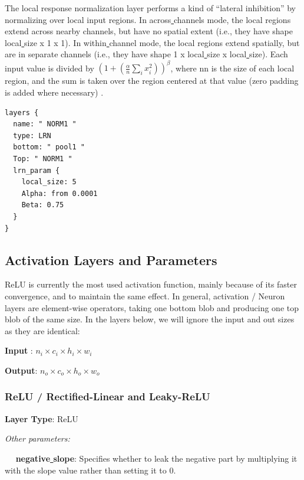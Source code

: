 \documentclass[12pt]{article}
\begin{document}
The local response normalization layer performs a kind of “lateral inhibition” by normalizing over local input regions. In across\underline{{ }{ }}channels mode, the local regions extend across nearby channels, but have no spatial extent (i.e., they have shape local\underline{{ }{ }}size x 1 x 1). In within\underline{{ }{ }}channel mode, the local regions extend spatially, but are in separate channels (i.e., they have shape 1 x local\underline{{ }{ }}size x local\underline{{ }{ }}size). Each input value is divided by $(1+(\frac{\alpha}{n}\sum_{i}x_{i}^{2}))^{\beta}$, where nn is the size of each local region, and the sum is taken over the region centered at that value (zero padding is added where necessary) \cite{Berkeley}.

\begin{lstlisting}[style=json, frame=single]
layers {
  name: " NORM1 "
  type: LRN
  bottom: " pool1 "
  Top: " NORM1 "
  lrn_param {
    local_size: 5
    Alpha: from 0.0001
    Beta: 0.75
  }
}
\end{lstlisting}

\newpage

\subsection{Activation Layers and Parameters}

ReLU is currently the most used activation function, mainly because of its faster convergence, and to maintain the same effect. In general, activation / Neuron layers are element-wise operators, taking one bottom blob and producing one top blob of the same size. In the layers below, we will ignore the input and out sizes as they are identical:

\noindent \textbf{Input} : $n_{i} \times c_{i}  \times h_{i}  \times w_{i} $

\noindent \textbf{Output}: $n_{o}  \times c_{o} \times h_{o} \times w_{o}$

\subsubsection{ReLU / Rectified-Linear and Leaky-ReLU}

\noindent \textbf{Layer Type}: ReLU

\emph{Other parameters:}

\noindent 　 \textbf{negative\underline{{ }{ }}slope}: Specifies whether to leak the negative part by multiplying it with the slope value rather than setting it to 0.
\end{document}
